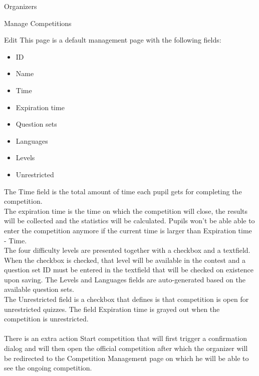 \begin{section}{Organizers}
\begin{subsection}{Manage Competitions}
		\begin{subsubsection}{Edit}
			This page is a default management page with the following fields:
			\begin{itemize}
				\item ID
				\item Name
				\item Time
				\item Expiration time
				\item Question sets
				\item Languages
				\item Levels
				\item Unrestricted
			\end{itemize}
			The Time field is the total amount of time each pupil gets for completing
			the competition.\\
			The expiration time is the time on which the competition will close,
			the results will be collected and the statistics will be calculated.
			Pupils won't be able able to enter the competition anymore if the
			current time is larger than Expiration time - Time.\\
			The four difficulty levels are presented together with a checkbox and a
			textfield. When the checkbox is checked, that level will be available in the
			contest and a question set ID must be entered in the textfield that will be
			checked on existence upon saving.
			The Levels and Languages fields are auto-generated based on the
			available question sets. \\
			The Unrestricted field is a checkbox that defines is that competition is open
			for unrestricted quizzes. The field Expiration time is grayed out when the
			competition is unrestricted.\\
			\\
			There is an extra action Start competition that will first trigger a
			confirmation dialog and will then open the official competition after which
			the organizer will be redirected to the Competition Management page on which
			he will be able to see the ongoing competition.
		\end{subsubsection}
	\end{subsection}
\end{section}
